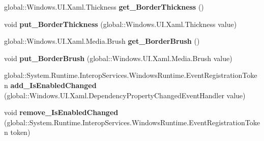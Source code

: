 \begin{DoxyCompactItemize}
\item 
\mbox{\label{interface_windows_1_1_u_i_1_1_xaml_1_1_controls_1_1_i_control_a368b66c8a1f1040880bdefc07e7cb85b}} 
global\+::\+Windows.\+U\+I.\+Xaml.\+Thickness {\bfseries get\+\_\+\+Border\+Thickness} ()
\item 
\mbox{\label{interface_windows_1_1_u_i_1_1_xaml_1_1_controls_1_1_i_control_ab6fd6e86f54e793f12961312b55b372f}} 
void {\bfseries put\+\_\+\+Border\+Thickness} (global\+::\+Windows.\+U\+I.\+Xaml.\+Thickness value)
\item 
\mbox{\label{interface_windows_1_1_u_i_1_1_xaml_1_1_controls_1_1_i_control_a1abfbeb7516aaa3813e93972e9cd5675}} 
global\+::\+Windows.\+U\+I.\+Xaml.\+Media.\+Brush {\bfseries get\+\_\+\+Border\+Brush} ()
\item 
\mbox{\label{interface_windows_1_1_u_i_1_1_xaml_1_1_controls_1_1_i_control_a4c2d7d5305d305b773e5ad689a8890bd}} 
void {\bfseries put\+\_\+\+Border\+Brush} (global\+::\+Windows.\+U\+I.\+Xaml.\+Media.\+Brush value)
\item 
\mbox{\label{interface_windows_1_1_u_i_1_1_xaml_1_1_controls_1_1_i_control_a37411d40405261227231f8142b22f8e0}} 
global\+::\+System.\+Runtime.\+Interop\+Services.\+Windows\+Runtime.\+Event\+Registration\+Token {\bfseries add\+\_\+\+Is\+Enabled\+Changed} (global\+::\+Windows.\+U\+I.\+Xaml.\+Dependency\+Property\+Changed\+Event\+Handler value)
\item 
\mbox{\label{interface_windows_1_1_u_i_1_1_xaml_1_1_controls_1_1_i_control_a9536f630fb699b5e3696f745e6f1fd92}} 
void {\bfseries remove\+\_\+\+Is\+Enabled\+Changed} (global\+::\+System.\+Runtime.\+Interop\+Services.\+Windows\+Runtime.\+Event\+Registration\+Token token)
\item 
\mbox{\label{interface_windows_1_1_u_i_1_1_xaml_1_1_controls_1_1_i_control_a68feca69bd9c95b33c4636574e86d05d}} 

\end{DoxyCompactItemize}
